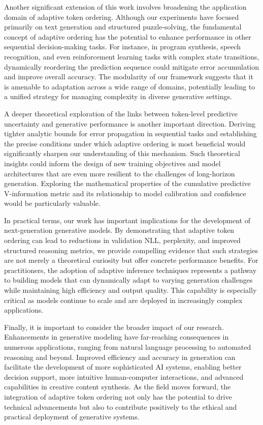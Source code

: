 \documentclass{article}
\begin{document}
\par Another significant extension of this work involves broadening the application domain of adaptive token ordering. Although our experiments have focused primarily on text generation and structured puzzle-solving, the fundamental concept of adaptive ordering has the potential to enhance performance in other sequential decision-making tasks. For instance, in program synthesis, speech recognition, and even reinforcement learning tasks with complex state transitions, dynamically reordering the prediction sequence could mitigate error accumulation and improve overall accuracy. The modularity of our framework suggests that it is amenable to adaptation across a wide range of domains, potentially leading to a unified strategy for managing complexity in diverse generative settings.

\par A deeper theoretical exploration of the links between token-level predictive uncertainty and generative performance is another important direction. Deriving tighter analytic bounds for error propagation in sequential tasks and establishing the precise conditions under which adaptive ordering is most beneficial would significantly sharpen our understanding of this mechanism. Such theoretical insights could inform the design of new training objectives and model architectures that are even more resilient to the challenges of long-horizon generation. Exploring the mathematical properties of the cumulative predictive V-information metric and its relationship to model calibration and confidence would be particularly valuable.

\par In practical terms, our work has important implications for the development of next-generation generative models. By demonstrating that adaptive token ordering can lead to reductions in validation NLL, perplexity, and improved structured reasoning metrics, we provide compelling evidence that such strategies are not merely a theoretical curiosity but offer concrete performance benefits. For practitioners, the adoption of adaptive inference techniques represents a pathway to building models that can dynamically adapt to varying generation challenges while maintaining high efficiency and output quality. This capability is especially critical as models continue to scale and are deployed in increasingly complex applications.

\par Finally, it is important to consider the broader impact of our research. Enhancements in generative modeling have far-reaching consequences in numerous applications, ranging from natural language processing to automated reasoning and beyond. Improved efficiency and accuracy in generation can facilitate the development of more sophisticated AI systems, enabling better decision support, more intuitive human-computer interactions, and advanced capabilities in creative content synthesis. As the field moves forward, the integration of adaptive token ordering not only has the potential to drive technical advancements but also to contribute positively to the ethical and practical deployment of generative systems.
\end{document}
